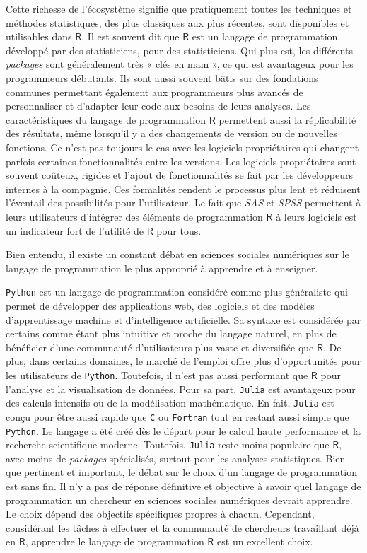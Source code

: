 \documentclass[
  letterpaper,
  DIV=11,
  numbers=noendperiod,
  oneside]{scrreprt}
\begin{document}
Cette richesse de l'écosystème signifie que pratiquement toutes les
techniques et méthodes statistiques, des plus classiques aux plus
récentes, sont disponibles et utilisables dans \(\textsf{R}\). Il est
souvent dit que \(\textsf{R}\) est un langage de programmation développé
par des statisticiens, pour des statisticiens. Qui plus est, les
différents \emph{packages} sont généralement très « clés en main », ce
qui est avantageux pour les programmeurs débutants. Ils sont aussi
souvent bâtis sur des fondations communes permettant également aux
programmeurs plus avancés de personnaliser et d'adapter leur code aux
besoins de leurs analyses. Les caractéristiques du langage de
programmation \(\textsf{R}\) permettent aussi la réplicabilité des
résultats, même lorsqu'il y a des changements de version ou de nouvelles
fonctions. Ce n'est pas toujours le cas avec les logiciels propriétaires
qui changent parfois certaines fonctionnalités entre les versions. Les
logiciels propriétaires sont souvent coûteux, rigides et l'ajout de
fonctionnalités se fait par les développeurs internes à la compagnie.
Ces formalités rendent le processus plus lent et réduisent l'éventail
des possibilités pour l'utilisateur. Le fait que \emph{SAS} et
\emph{SPSS} permettent à leurs utilisateurs d'intégrer des éléments de
programmation \(\textsf{R}\) à leurs logiciels est un indicateur fort de
l'utilité de \(\textsf{R}\) pour tous.

Bien entendu, il existe un constant débat en sciences sociales
numériques sur le langage de programmation le plus approprié à apprendre
et à enseigner.

\texttt{Python} est un langage de programmation considéré comme plus
généraliste qui permet de développer des applications web, des logiciels
et des modèles d'apprentissage machine et d'intelligence artificielle.
Sa syntaxe est considérée par certains comme étant plus intuitive et
proche du langage naturel, en plus de bénéficier d'une communauté
d'utilisateurs plus vaste et diversifiée que \(\textsf{R}\). De plus,
dans certains domaines, le marché de l'emploi offre plus d'opportunités
pour les utilisateurs de \texttt{Python}. Toutefois, il n'est pas aussi
performant que \(\textsf{R}\) pour l'analyse et la visualisation de
données. Pour sa part, \texttt{Julia} est avantageux pour des calculs
intensifs ou de la modélisation mathématique. En fait, \texttt{Julia}
est conçu pour être aussi rapide que \texttt{C} ou \texttt{Fortran} tout
en restant aussi simple que \texttt{Python}. Le langage a été créé dès
le départ pour le calcul haute performance et la recherche scientifique
moderne. Toutefois, \texttt{Julia} reste moins populaire que
\(\textsf{R}\), avec moins de \emph{packages} spécialisés, surtout pour
les analyses statistiques. Bien que pertinent et important, le débat sur
le choix d'un langage de programmation est sans fin. Il n'y a pas de
réponse définitive et objective à savoir quel langage de programmation
un chercheur en sciences sociales numériques devrait apprendre. Le choix
dépend des objectifs spécifiques propres à chacun. Cependant,
considérant les tâches à effectuer et la communauté de chercheurs
travaillant déjà en \(\textsf{R}\), apprendre le langage de
programmation \(\textsf{R}\) est un excellent choix.
\end{document}
